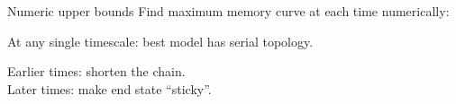 \documentclass[final,hyperref={pdfpagelabels=false,bookmarks=false}]{beamer}
\begin{document}
\begin{frame}{}
\begin{columns}[t]
\begin{column}{0.33\linewidth}

\begin{block}{Numeric upper bounds}
%
 Find maximum memory curve at each time numerically:
 
\parbox[c]{0.45\linewidth}{
 \begin{center}
 \end{center}
}
\hspace{0.5cm}
\parbox[c]{0.45\linewidth}{
 \begin{center}
 \end{center}
}
 
 At any single timescale: best model has serial topology.
 \hspace{1cm}
 \parbox[t]{0.5\linewidth}{
 Earlier times: shorten the chain.\\
 Later times: make end state ``sticky''.
 }
%
\end{block}





\end{column}
\end{columns}
\end{frame}
\end{document}
